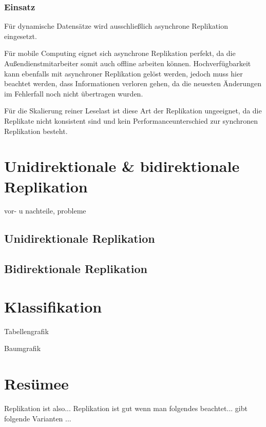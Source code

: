 \subsubsection{Einsatz}

Für dynamische Datensätze wird ausschließlich asynchrone Replikation eingesetzt.

Für mobile Computing eignet sich asynchrone Replikation perfekt, da die Außendienstmitarbeiter somit auch offline arbeiten können. Hochverfügbarkeit kann ebenfalls mit asynchroner Replikation gelöst werden, jedoch muss hier beachtet werden, dass Informationen verloren gehen, da die neuesten Änderungen im Fehlerfall noch nicht übertragen wurden.

Für die Skalierung reiner Leselast ist diese Art der Replikation ungeeignet, da die Replikate nicht konsistent sind und kein Performanceunterschied zur synchronen Replikation besteht.

\section{Unidirektionale \& bidirektionale Replikation}

vor- u nachteile, probleme

\subsection{Unidirektionale Replikation}

\subsection{Bidirektionale Replikation}

\section{Klassifikation}

Tabellengrafik

Baumgrafik

\section{Resümee}
Replikation ist also...
Replikation ist gut wenn man folgendes beachtet...
gibt folgende Varianten ...